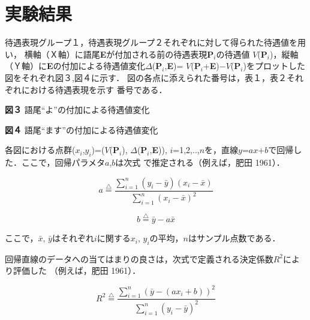 \section{実験結果}
待遇表現グループ１，待遇表現グループ２それぞれに対して得られた待遇値を用い，
横軸（Ｘ軸）に語尾{\bf E}が付加される前の待遇表現{\bf P}\(_{i}\)の待遇値
\(V\)({\bf P}\(_{i}\))，縦軸（Ｙ軸）に{\bf E}の付加による待遇値変化\hspace{-0.2mm}\(\Delta\)({\bf P}\(_{i}\),{\bf E})=
\(V\)({\bf P}\(_{i}\)+{\bf E})−\(V\)({\bf P}\(_{i}\))\hspace{-0.2mm}をプロットした図をそれぞれ図３,図４に示す．
図の各点に添えられた番号は，表１，表２それぞれにおける待遇表現を示す
番号である．

\begin{center}

{\bf 図３} 語尾``よ''の付加による待遇値変化
\end{center}
\begin{center}

{\bf 図４} 語尾``ます''の付加による待遇値変化
\end{center}

各図における点群(\(x_{i}\),\(y_{i}\))=(\(V\)({\bf P}\(_{i}\)), \(\Delta\)({\bf P}\(_{i}\),{\bf E})), 
\(i\)=1,2,..,\(n\)を，直線\(y\)=\(a\)\(x\)+\(b\)で回帰した．ここで，回帰パラメタ\(a\),\(b\)は次式
で推定される（例えば，肥田 1961）．

\begin{equation}
a \stackrel{\triangle}{=} \frac{\sum\limits_{i=1}^{n} (y_{i}-\bar{y})(x_{i}-\bar{x})}{\sum\limits_{i=1}^{n} (x_{i}-\bar{x})^{2}}
\end{equation}

\begin{equation}
b \stackrel{\triangle}{=} \bar{y}−a\bar{x}
\end{equation}

ここで，\(\bar{x}\), \(\bar{y}\)はそれぞれ\(i\)に関する\(x_{i}\), \(y_{i}\)の平均，\(n\)はサンプル点数である．

回帰直線のデータへの当てはまりの良さは，次式で定義される決定係数\(R^{2}\)により評価した
（例えば，肥田 1961）．

\begin{equation}
R^{2} \stackrel{\triangle}{=} \frac{\sum\limits_{i=1}^{n} (\bar{y}-(a x_{i}+b))^{2}}
{\sum\limits_{i=1}^{n} (y_{i}-\bar{y})^{2}}
\end{equation}

